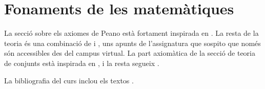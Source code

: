 \documentclass[./primer.tex]{subfiles}
\begin{document}
\part{Fonaments de les matemàtiques}



\printbibliography
La secció sobre els axiomes de Peano està fortament inspirada en \cite{notesKumar}.
La resta de la teoria és una combinació de \cite{AntoineRosaCampsMoncasiIntroduccioAlgebraAbstracta} i \cite{TemesFonaments}, uns apunts de l'assignatura que sospito que només són accessibles des del campus virtual.
La part axiomàtica de la secció de teoria de conjunts està inspirada en \cite{ACTEAguade}, i la resta segueix \cite{TemesFonaments}.

La bibliografia del curs inclou els textos \cite{AntoineRosaCampsMoncasiIntroduccioAlgebraAbstracta, CastelletLlerenaAlgebraLinealIGeometria, GodementAlgebra, NutsAndBoltsOfProofs, BujalanceBujalanceCostaProblemasMatematicaDiscreta, IntroductionToMathematicalReasoning, ChapterZeroSchumacher}.
\end{document}
